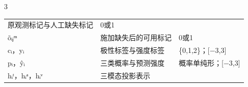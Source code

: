 \begin{PaperTable}{3}
\begin{table}[!htbp]
\begin{tabular}{@{}lll@{}}
\begin{minipage}[t]{\dimexpr 0.440000\linewidth-1.760000\tabcolsep\relax}
原观测标记与人工缺失标记\strut
\end{minipage} & \begin{minipage}[t]{\dimexpr 0.330000\linewidth-1.320000\tabcolsep\relax}\raggedright
0或1\strut
\end{minipage}\tabularnewline
\begin{minipage}[t]{\dimexpr 0.230000\linewidth-0.920000\tabcolsep\relax}\raggedright
õᵢⱼᵐ\strut
\end{minipage} & \begin{minipage}[t]{\dimexpr 0.440000\linewidth-1.760000\tabcolsep\relax}\raggedright
施加缺失后的可用标记\strut
\end{minipage} & \begin{minipage}[t]{\dimexpr 0.330000\linewidth-1.320000\tabcolsep\relax}\raggedright
0或1\strut
\end{minipage}\tabularnewline
\begin{minipage}[t]{\dimexpr 0.230000\linewidth-0.920000\tabcolsep\relax}\raggedright
cᵢ，yᵢ\strut
\end{minipage} & \begin{minipage}[t]{\dimexpr 0.440000\linewidth-1.760000\tabcolsep\relax}\raggedright
极性标签与强度标签\strut
\end{minipage} & \begin{minipage}[t]{\dimexpr 0.330000\linewidth-1.320000\tabcolsep\relax}\raggedright
\{0,1,2\}；{[}−3,3{]}\strut
\end{minipage}\tabularnewline
\begin{minipage}[t]{\dimexpr 0.230000\linewidth-0.920000\tabcolsep\relax}\raggedright
pᵢ，ŷᵢ\strut
\end{minipage} & \begin{minipage}[t]{\dimexpr 0.440000\linewidth-1.760000\tabcolsep\relax}\raggedright
三类概率与预测强度\strut
\end{minipage} & \begin{minipage}[t]{\dimexpr 0.330000\linewidth-1.320000\tabcolsep\relax}\raggedright
概率单纯形；{[}−3,3{]}\strut
\end{minipage}\tabularnewline
\begin{minipage}[t]{\dimexpr 0.230000\linewidth-0.920000\tabcolsep\relax}\raggedright
hᵢᵗ，hᵢᵃ，hᵢᵛ\strut
\end{minipage} & \begin{minipage}[t]{\dimexpr 0.440000\linewidth-1.760000\tabcolsep\relax}\raggedright
三模态投影表示\strut
\end{minipage} & \begin{minipage}[t]{\dimexpr 0.330000\linewidth-1.320000\tabcolsep\relax}\raggedright

\end{minipage}
\end{tabular}
\end{table}
\end{PaperTable}
